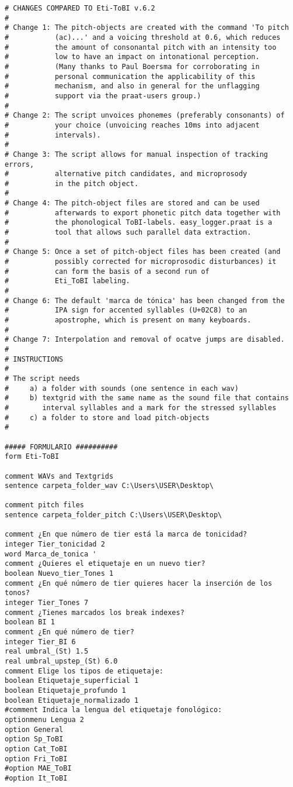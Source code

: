 \begin{lstlisting}
# CHANGES COMPARED TO Eti-ToBI v.6.2
# 
# Change 1: The pitch-objects are created with the command 'To pitch 
#           (ac)...' and a voicing threshold at 0.6, which reduces 
#           the amount of consonantal pitch with an intensity too 
#           low to have an impact on intonational perception. 
#           (Many thanks to Paul Boersma for corroborating in 
#           personal communication the applicability of this 
#           mechanism, and also in general for the unflagging 
#           support via the praat-users group.)
#
# Change 2: The script unvoices phonemes (preferably consonants) of 
#           your choice (unvoicing reaches 10ms into adjacent 
#           intervals).
#
# Change 3: The script allows for manual inspection of tracking errors,   
#           alternative pitch candidates, and microprosody 
#           in the pitch object.
#
# Change 4: The pitch-object files are stored and can be used 
#           afterwards to export phonetic pitch data together with 
#           the phonological ToBI-labels. easy_logger.praat is a 
#           tool that allows such parallel data extraction.
#
# Change 5: Once a set of pitch-object files has been created (and 
#           possibly corrected for microprosodic disturbances) it 
#           can form the basis of a second run of 
#           Eti_ToBI labeling. 
#
# Change 6: The default 'marca de tónica' has been changed from the 
#           IPA sign for accented syllables (U+02C8) to an 
#           apostrophe, which is present on many keyboards.
#   
# Change 7: Interpolation and removal of ocatve jumps are disabled.
#
# INSTRUCTIONS
# 
# The script needs 
#     a) a folder with sounds (one sentence in each wav)
#     b) textgrid with the same name as the sound file that contains 
#        interval syllables and a mark for the stressed syllables
#     c) a folder to store and load pitch-objects
#

##### FORMULARIO ##########
form Eti-ToBI

comment WAVs and Textgrids
sentence carpeta_folder_wav C:\Users\USER\Desktop\

comment pitch files
sentence carpeta_folder_pitch C:\Users\USER\Desktop\

comment ¿En que número de tier está la marca de tonicidad?
integer Tier_tonicidad 2
word Marca_de_tonica '
comment ¿Quieres el etiquetaje en un nuevo tier?
boolean Nuevo_tier_Tones 1
comment ¿En qué número de tier quieres hacer la inserción de los tonos?
integer Tier_Tones 7
comment ¿Tienes marcados los break indexes?
boolean BI 1
comment ¿En qué número de tier?
integer Tier_BI 6
real umbral_(St) 1.5
real umbral_upstep_(St) 6.0
comment Elige los tipos de etiquetaje:
boolean Etiquetaje_superficial 1
boolean Etiquetaje_profundo 1
boolean Etiquetaje_normalizado 1
#comment Indica la lengua del etiquetaje fonológico:
optionmenu Lengua 2
option General
option Sp_ToBI
option Cat_ToBI
option Fri_ToBI
#option MAE_ToBI
#option It_ToBI


\end{lstlisting}
